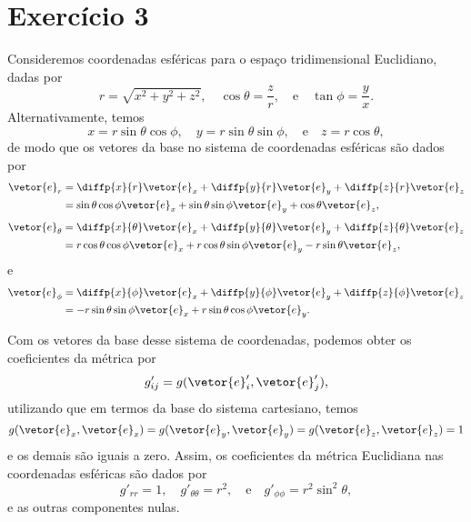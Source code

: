 \section*{Exercício 3}
Consideremos coordenadas esféricas para o espaço tridimensional Euclidiano, dadas por
\begin{equation*}
    r = \sqrt{x^2 + y^2 + z^2},\quad \cos\theta = \frac{z}{r},\quad\text{e}\quad\tan\phi=\frac{y}{x}.
\end{equation*}
Alternativamente, temos
\begin{equation*}
    x = r\sin\theta\cos\phi,\quad y = r\sin\theta\sin\phi,\quad\text{e}\quad z = r\cos\theta,
\end{equation*}
de modo que os vetores da base no sistema de coordenadas esféricas são dados por
\begin{align*}
    \vetor{e}_r &= \diffp{x}{r}\vetor{e}_x + \diffp{y}{r}\vetor{e}_y + \diffp{z}{r}\vetor{e}_z\\
                &= \sin\theta\cos\phi\vetor{e}_x + \sin\theta\sin\phi\vetor{e}_y + \cos\theta \vetor{e}_z,
\end{align*}
\begin{align*}
    \vetor{e}_\theta &= \diffp{x}{\theta}\vetor{e}_x + \diffp{y}{\theta}\vetor{e}_y + \diffp{z}{\theta}\vetor{e}_z \\
                   &= r\cos\theta\cos\phi \vetor{e}_x + r\cos\theta\sin\phi\vetor{e}_y - r\sin\theta\vetor{e}_z,
\end{align*}
e
\begin{align*}
    \vetor{e}_\phi &= \diffp{x}{\phi}\vetor{e}_x + \diffp{y}{\phi}\vetor{e}_y + \diffp{z}{\phi}\vetor{e}_z\\
                   &= -r\sin\theta\sin\phi \vetor{e}_x + r\sin\theta\cos\phi\vetor{e}_y.
\end{align*}

Com os vetores da base desse sistema de coordenadas, podemos obter os coeficientes da métrica por
\begin{equation*}
    g'_{ij} = g(\vetor{e}_i', \vetor{e}_j'),
\end{equation*}
utilizando que em termos da base do sistema cartesiano, temos
\begin{equation*}
    g(\vetor{e}_x, \vetor{e}_x) = g(\vetor{e}_y, \vetor{e}_y) = g(\vetor{e}_z, \vetor{e}_z) = 1
\end{equation*}
e os demais são iguais a zero. Assim, os coeficientes da métrica Euclidiana nas coordenadas esféricas são dados por
\begin{equation*}
    g'_{rr} = 1, \quad g'_{\theta\theta} = r^2, \quad\text{e}\quad g'_{\phi\phi} = r^2\sin^2\theta,
\end{equation*}
e as outras componentes nulas.

